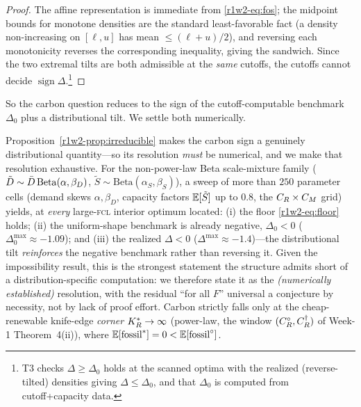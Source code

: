 \begin{proof}
The affine representation is immediate from \eqref{r1w2-eq:fos}; the midpoint bounds for
monotone densities are the standard least-favorable fact (a density non-increasing
on $[\ell,u]$ has mean $\le(\ell+u)/2$), and reversing each
monotonicity reverses the corresponding inequality, giving the sandwich. Since the
two extremal tilts are both admissible at the \emph{same} cutoffs, the cutoffs
cannot decide $\operatorname{sign}\Delta$.\footnote{T3 checks $\Delta\ge\Delta_0$
holds at the scanned optima with the realized (reverse-tilted) densities giving
$\Delta\le\Delta_0$, and that $\Delta_0$ is computed from cutoff+capacity data.}
\end{proof}

So the carbon question reduces to the sign of the cutoff-computable benchmark
$\Delta_0$ plus a distributional tilt. We settle both numerically.

\begin{proposition}\label{r1w2-prop:regimecarbon}
Proposition~\ref{r1w2-prop:irreducible} makes the carbon sign a genuinely distributional
quantity---so its resolution \emph{must} be numerical, and we make that resolution
exhaustive. For the non-power-law Beta scale-mixture family
($\tilde D\sim\bar D\,\mathrm{Beta}(\alpha,\beta_D)$,
$\tilde S\sim\mathrm{Beta}(\alpha_S,\beta_S)$), a sweep of
more than $250$ parameter cells (demand skews $\alpha,\beta_D$, capacity factors
$\mathbb{E}[\tilde S]$ up to $0.8$, the $C_R\times C_M$ grid) yields, at \emph{every}
large-\textsc{fcl} interior optimum located: \textup{(i)}
the floor \eqref{r1w2-eq:floor} holds; \textup{(ii)} the uniform-shape benchmark is
already negative, $\Delta_0<0$ ($\Delta_0^{\max}\approx-1.09$); and \textup{(iii)}
the realized $\Delta<0$ ($\Delta^{\max}\approx-1.4$)---the distributional tilt
\emph{reinforces} the negative benchmark rather than reversing it. Given the
impossibility result, this is the strongest statement the structure admits short of
a distribution-specific computation: we therefore state it as the
\emph{(numerically established)} resolution, with the residual ``for all $F$''
universal a conjecture by necessity, not by lack of proof effort. Carbon
strictly falls only at the cheap-renewable knife-edge \emph{corner} $K_R^{*}\to\infty$
(power-law, the window $(C_R^{\circ},C_R^{\dagger})$ of Week-1 Theorem~4(ii)), where
$\mathbb{E}[\text{fossil}^{*}]=0<\mathbb{E}[\text{fossil}^{\circ}]$.
\end{proposition}

